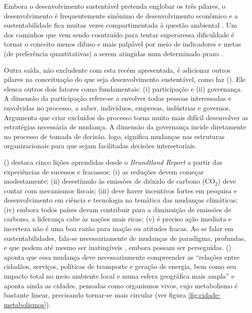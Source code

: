 Embora o desenvolvimento sustentável pretenda englobar os três pilares, o desenvolvimento é frequentemente sinônimo de desenvolvimento econômico e a sustentabilidade fica muitas vezes compartimentada à questão ambiental \cite{ONU2010}. Um dos caminhos que vem sendo cosntruído para tentar superaressa dificuldade é tornar o conceito menos difuso e mais palpável por meio de indicadores \cite{CHAMBERS2000,BOULANGER2008,BARRETT2010,FORTES2012} e metas (de preferência quantitativas) a serem atingidas num determinado prazo \cite{ONU2010,ONU2014}.

Outra saída, não excludente com esta recém apresentada, é adicionar outros pilares na conceituação do que seja desenvolvimento sustentável, como faz 
 (\citeyear{BANISTER2005}). Ele elenca outros dois fatores como fundamentais: (i) participação e (ii) governança. A dimensão da participação refere-se a envolver todas pessoas interessadas e envolvidas no processo, a saber, indivíduos, empresas, indústrias e governos. Argumenta que criar excluídos do processo torna muito mais difícil desenvolver as estratégias necessária de mudança. A dimensão da governança incide diretamente no processo de tomada de decisão, logo, significa mudanças nas estruturas organizacionais para que sejam facilitadas decisões intersetoriais.

 (\citeyear{BANISTER2005}) destaca cinco lições aprendidas desde o \emph{Brundtland Report} a partir das experiências de sucessos e fracassos: (i) as reduções devem começar modestamente; (ii) desestímulo às emissões de dióxido de carbono (CO$_2$) deve contar com mecanismos fiscais; (iii) deve haver incentivos fortes em pesquisa e desenvolvimento em ciência e tecnologia na temática das mudanças climáticas; (iv) embora todos países devam contribuir para a diminuição de emissões de carbono, a liderança cabe às nações mais ricas; (v) é preciso ação imediata e incerteza não é uma boa razão para inação ou atitudes fracas.
Ao se falar em sustentabilidades, fala-se necessariamente de mudanças de paradigma, profundas, e que podem até mesmo ser inatingíveis \cite{GLASBY2002}, embora possam ser perseguidas.  (\citeyear{ROGERS2000}) aponta que essa mudança deve necessariamente compreender as ``relações entre cidadãos, serviços, políticas de transporte e geração de energia, bem como seu impacto total no meio ambiente local e numa esfera geográfica mais ampla'' e aponta ainda as cidades, pensadas como organismos vivos, cujo metabolismo é bastante linear, precisando tornar-se mais circular (ver figura \ref{fig:cidade-metabolismos}).

